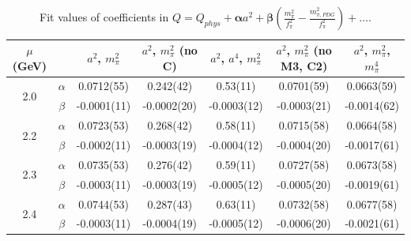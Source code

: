 \documentclass[12pt]{extarticle}
\begin{document}
\begin{table}[h!]
\begin{center}
\begin{tabular}{|c c|c|c|c|c|c|}
\hline
$\mu$ (GeV) &  & $a^2$, $m_\pi^2$& $a^2$, $m_\pi^2$ (no C)& $a^2$, $a^4$, $m_\pi^2$& $a^2$, $m_\pi^2$ (no M3, C2)& $a^2$, $m_\pi^2$, $m_\pi^4$\\
\hline
\multirow{2}{0.5in}{2.0} & $\alpha$ & 0.0712(55)& 0.242(42)& 0.53(11)& 0.0701(59)& 0.0663(59)\\
 & $\beta$ & -0.0001(11)& -0.0002(20)& -0.0003(12)& -0.0003(21)& -0.0014(62)\\
\hline
\multirow{2}{0.5in}{2.2} & $\alpha$ & 0.0723(53)& 0.268(42)& 0.58(11)& 0.0715(58)& 0.0664(58)\\
 & $\beta$ & -0.0002(11)& -0.0003(19)& -0.0004(12)& -0.0004(20)& -0.0017(61)\\
\hline
\multirow{2}{0.5in}{2.3} & $\alpha$ & 0.0735(53)& 0.276(42)& 0.59(11)& 0.0727(58)& 0.0673(58)\\
 & $\beta$ & -0.0003(11)& -0.0003(19)& -0.0005(12)& -0.0005(20)& -0.0019(61)\\
\hline
\multirow{2}{0.5in}{2.4} & $\alpha$ & 0.0744(53)& 0.287(43)& 0.63(11)& 0.0732(58)& 0.0677(58)\\
 & $\beta$ & -0.0003(11)& -0.0004(19)& -0.0005(12)& -0.0006(20)& -0.0021(61)\\
\hline
\end{tabular}
\caption{Fit values of coefficients in $Q = Q_{phys} + \mathbf{\alpha} a^2 + \mathbf{\beta}\left(\frac{m_\pi^2}{f_\pi^2}-\frac{m_{\pi,PDG}^2}{f_\pi^2}\right) + \ldots$.}
\end{center}
\end{table}




















\clearpage
\end{document}
